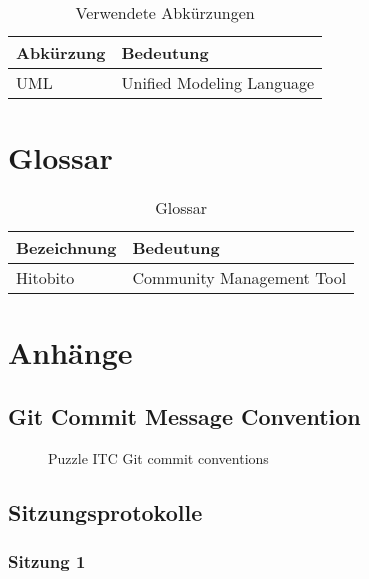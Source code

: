 \begin{table}[H]
    \begin{tabular}{|L{0.3\textwidth}|L{0.6\textwidth}|}
        \hline
         \textbf{\color{white}Abkürzung} & \textbf{\color{white}Bedeutung} \\[12pt]
        \hline
        UML & Unified Modeling Language \\
        \hline
    \end{tabular}
    \caption{Verwendete Abkürzungen}
\end{table}

\chapter{Glossar}

\begin{table}[H]
    \begin{tabular}{|L{0.3\textwidth}|L{0.6\textwidth}|}
        \hline
         \textbf{\color{white}Bezeichnung} & \textbf{\color{white}Bedeutung} \\[12pt]
        \hline
        Hitobito & Community Management Tool \\
        \hline
    \end{tabular}
    \caption{Glossar}
\end{table}

\chapter{Anhänge}

\section{Git Commit Message Convention}
\label{sec:gitconv}
\begin{figure}[h]
    \centering
    \caption{Puzzle ITC Git commit conventions}
\end{figure}

\section{Sitzungsprotokolle}
\subsection{Sitzung 1}

